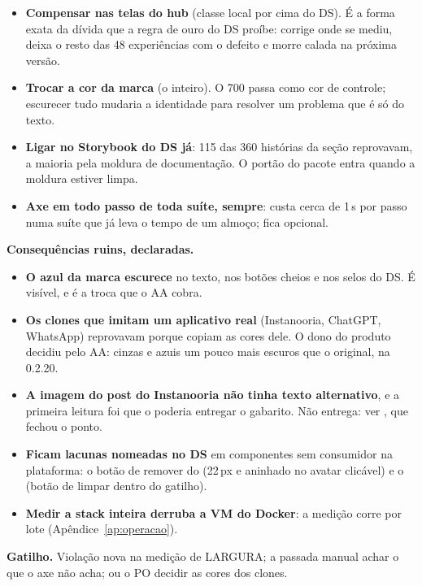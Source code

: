 \begin{itemize}
  \item \textbf{Compensar nas telas do hub} (classe local por cima do DS). É a
    forma exata da dívida que a regra de ouro do DS proíbe: corrige onde se
    mediu, deixa o resto das 48 experiências com o defeito e morre calada na
    próxima versão.
  \item \textbf{Trocar a cor da marca} (o  inteiro). O 700
    passa como cor de controle; escurecer tudo mudaria a identidade para
    resolver um problema que é só do texto.
  \item \textbf{Ligar  no Storybook do DS já}: 115 das
    360 histórias da seção  reprovavam, a maioria pela moldura de
    documentação. O portão do pacote entra quando a moldura estiver limpa.
  \item \textbf{Axe em todo passo de toda suíte, sempre}: custa cerca de
    1\,s por passo numa suíte que já leva o tempo de um almoço; fica opcional.
\end{itemize}

\textbf{Consequências ruins, declaradas.}

\begin{itemize}
  \item \textbf{O azul da marca escurece} no texto, nos botões cheios e nos
    selos do DS. É visível, e é a troca que o AA cobra.
  \item \textbf{Os clones que imitam um aplicativo real} (Instanooria, ChatGPT,
    WhatsApp) reprovavam porque copiam as cores dele. O dono do produto decidiu
    pelo AA: cinzas e azuis um pouco mais escuros que o original, na 0.2.20.
  \item \textbf{A imagem do post do Instanooria não tinha texto alternativo}, e
    a primeira leitura foi que o  poderia entregar o gabarito.
    Não entrega: ver , que fechou o ponto.
  \item \textbf{Ficam lacunas nomeadas no DS} em componentes sem consumidor na
    plataforma: o botão de remover do  (22\,px e aninhado no avatar
    clicável) e o  (botão de limpar dentro do gatilho).
  \item \textbf{Medir a stack inteira derruba a VM do Docker}: a medição
    corre por lote (Apêndice~\ref{ap:operacao}).
\end{itemize}

\textbf{Gatilho.} Violação nova na medição de LARGURA; a passada manual achar
o que o axe não acha; ou o PO decidir as cores dos clones.
